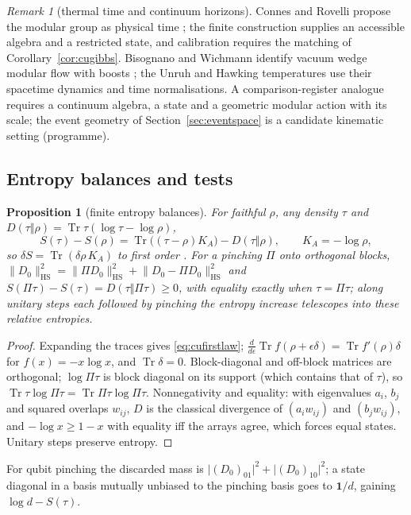 \documentclass[aps,pra,onecolumn,superscriptaddress,nofootinbib,10pt]{revtex4-2}
\newtheorem{proposition}[theorem]{Proposition}
\theoremstyle{definition}
\theoremstyle{remark}
\newtheorem{remark}[theorem]{Remark}
\newcommand{\tr}{\operatorname{Tr}}
\begin{document}
\begin{remark}[thermal time and continuum horizons]\label{rem:cuthermal}
Connes and Rovelli propose the modular group as physical time \cite{n1-connes}; the finite construction
supplies an accessible algebra and a restricted state, and calibration requires the matching of
Corollary~\ref{cor:cugibbs}.  Bisognano and Wichmann identify vacuum wedge modular flow with boosts \cite{n1-bw};
the Unruh and Hawking temperatures \cite{n1-unruh,n1-hawking} use their spacetime dynamics and time
normalisations.  A comparison-register analogue requires a continuum algebra, a state and a geometric
modular action with its scale; the event geometry of Section~\ref{sec:eventspace} is a candidate kinematic setting
(programme).
\end{remark}

\subsection{Entropy balances and tests}\label{sec:cuentropy}

\begin{proposition}[finite entropy balances]\label{prop:cubalances}
For faithful $\rho$, any density $\tau$ and $D(\tau\Vert\rho)=\tr\tau(\log\tau-\log\rho)$,
\begin{equation}\label{eq:cufirstlaw}
S(\tau)-S(\rho)=\tr\bigl((\tau-\rho)K_A\bigr)-D(\tau\Vert\rho),\qquad K_A=-\log\rho,
\end{equation}
so $\delta S=\tr(\delta\rho\,K_A)$ to first order \cite{n1-blanco}.  For a pinching $\Pi$ onto orthogonal blocks,
$\lVert D_0\rVert_{\mathrm{HS}}^2=\lVert\Pi D_0\rVert_{\mathrm{HS}}^2+\lVert D_0-\Pi D_0\rVert_{\mathrm{HS}}^2$ and $S(\Pi\tau)-S(\tau)=D(\tau\Vert\Pi\tau)\ge0$, with equality exactly when $\tau=\Pi\tau$; along
unitary steps each followed by pinching the entropy increase telescopes into these relative entropies.
\end{proposition}
\begin{proof}
Expanding the traces gives \eqref{eq:cufirstlaw}; $\frac{d}{d\epsilon}\tr f(\rho+\epsilon\delta)=\tr f'(\rho)\delta$ for $f(x)=-x\log x$, and $\tr\delta=0$.  Block-diagonal and
off-block matrices are orthogonal; $\log\Pi\tau$ is block diagonal on its support (which contains that of $\tau$), so
$\tr\tau\log\Pi\tau=\tr\Pi\tau\log\Pi\tau$.  Nonnegativity and equality: with eigenvalues $a_i$, $b_j$ and squared overlaps $w_{ij}$,
$D$ is the classical divergence of $(a_iw_{ij})$ and $(b_jw_{ij})$, and $-\log x\ge1-x$ with equality iff the arrays agree,
which forces equal states.  Unitary steps preserve entropy.
\end{proof}
\noindent For qubit pinching the discarded mass is $\lvert(D_0)_{01}\rvert^2+\lvert(D_0)_{10}\rvert^2$; a state diagonal in a basis mutually unbiased
to the pinching basis goes to $\mathbf1/d$, gaining $\log d-S(\tau)$.
\end{document}
